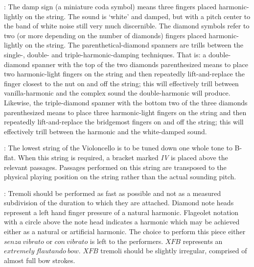 \documentclass[11pt]{article}
\newcommand*\circled[1]{\tikz[baseline=(char.base)]{
            \node[shape=circle,draw,inner sep=1pt] (char) {#1};}}
\begin{document}
\begin{center}
 : \circled{1} The damp sign (a miniature coda symbol) means three fingers placed harmonic-lightly on the string. The sound is `white' and damped, but with a pitch center to the band of white noise still very much discernible. \circled{2} The diamond symbols refer to two (or more depending on the number of diamonds) fingers placed harmonic-lightly on the string. \circled{3} The parenthetical-diamond spanners are trills between the single-, double- and triple-harmonic-damping techniques. That is: a double-diamond spanner with the top of the two diamonds parenthesized means to place two harmonic-light fingers on the string and then repeatedly lift-and-replace the finger closest to the nut on and off the string; this will effectively trill between vanilla-harmonic and the complex sound the double-harmonic will produce. Likewise, the triple-diamond spanner with the bottom two of the three diamonds parenthesized means to place three harmonic-light fingers on the string and then repeatedly lift-and-replace the bridgemost fingers on and off the string; this will effectively trill between the harmonic and the white-damped sound.
\rightskip\leftskip
\phantom{text} \hfill \phantom{()}

 : The lowest string of the Violoncello is to be tuned down one whole tone to B-flat. When this string is required, a bracket marked \textit{IV} is placed above the relevant passages. Passages performed on this string are transposed to the physical playing position on the string rather than the actual sounding pitch.
\rightskip\leftskip
\phantom{text} \hfill \phantom{()}

 : \circled{1} Tremoli should be performed as fast as possible and not as a measured subdivision of the duration to which they are attached. \circled{2} Diamond note heads represent a left hand finger pressure of a natural harmonic. Flageolet notation with a circle above the note head indicates a harmonic which may be achieved either as a natural or artificial harmonic. \circled{3} The choice to perform this piece either $senza \ vibrato$ or $con \ vibrato$ is left to the performers. \circled{4} $XFB$ represents an $extremely \ flautando \ bow$. $XFB$ tremoli should be slightly irregular, comprised of almost full bow strokes.
\rightskip\leftskip
\phantom{text} \hfill \phantom{()}


\end{center}
\end{document}
